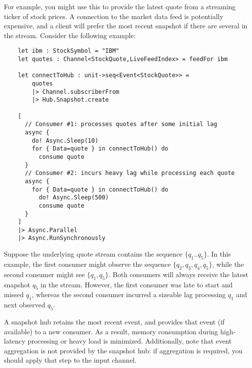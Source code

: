 \documentclass{article}
\begin{document}
For example, you might use this to provide the latest quote from a streaming ticker of stock prices.  A connection to the market data feed is potentially expensive, and a client will prefer the most recent snapshot if there are several in the stream.  Consider the following example:

\begin{verbatim}
    let ibm : StockSymbol = "IBM"
    let quotes : Channel<StockQuote,LiveFeedIndex> = feedFor ibm

    let connectToHub : unit->seq<Event<StockQuote>> =
        quotes
        |> Channel.subscriberFrom
        |> Hub.Snapshot.create

    [
      // Consumer #1: processes quotes after some initial lag
      async {
        do! Async.Sleep(10)
        for { Data=quote } in connectToHub() do
          consume quote 
      }
      // Consumer #2: incurs heavy lag while processing each quote
      async {
        for { Data=quote } in connectToHub() do
          do! Async.Sleep(500)
          consume quote
      }
    ]
    |> Async.Parallel
    |> Async.RunSynchronously
\end{verbatim}

Suppose the underlying quote stream contains the sequence $\{q_1..q_5\}$. In this example, the first consumer might observe the sequence $\{q_2,q_3,q_4,q_5\}$, while the second consumer might see $\{q_1,q_5\}$. Both consumers will always receive the latest snapshot $q_5$ in the stream.  However, the first consumer was late to start and missed $q_1$, whereas the second consumer incurred a sizeable lag processing $q_1$ and next observed $q_5$.

A snapshot hub retains the most recent event, and provides that event (if available) to a new consumer. As a result, memory consumption during high-latency processing or heavy load is minimized.  Additionally, note that event aggregation is not provided by the snapshot hub: if aggregation is required, you should apply that step to the input channel.


\clearpage
\appendix
\end{document}
